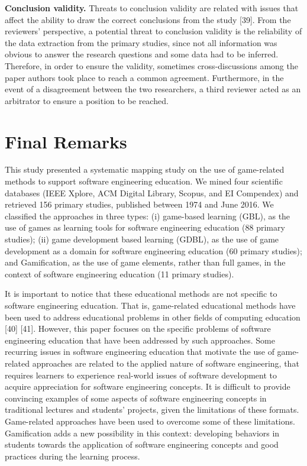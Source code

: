 \textbf{Conclusion validity.} Threats to conclusion validity are related with issues that affect the ability to draw the correct conclusions from the study \citep{Wohlin:2012}[39]. From the reviewers’ perspective, a potential threat to conclusion validity is the reliability of the data extraction from the primary studies, since not all information was obvious to answer the research questions and some data had to be inferred. Therefore, in order to ensure the validity, sometimes cross-discussions among the paper authors took place to reach a common agreement. Furthermore, in the event of a disagreement between the two researchers, a third reviewer acted as an arbitrator to ensure a position to be reached.

\section{Final Remarks}
\label{sec:final}

This study presented a systematic mapping study on the use of game-related methods to support software engineering education. We mined four scientific databases (IEEE Xplore, ACM Digital Library, Scopus, and EI Compendex) and retrieved 156 primary studies, published between 1974 and June 2016. We classified the approaches in three types: (i) game-based learning (GBL), as the use of games as learning tools for software engineering education (88 primary studies); (ii) game development based learning (GDBL), as the use of game development as a domain for software engineering education (60 primary studies); and Gamification, as the use of game elements, rather than full games, in the context of software engineering education (11 primary studies). 

It is important to notice that these educational methods are not specific to software engineering education. That is, game-related educational methods have been used to address educational problems in other fields of computing education \citep{Battistella:2016, Petri:2017}[40] [41]. However, this paper focuses on the specific problems of software engineering education that have been addressed by such approaches. Some recurring issues in software engineering education that motivate the use of game-related approaches are related to the applied nature of software engineering, that requires learners to experience real-world issues of software development to acquire appreciation for software engineering concepts. It is difficult to provide convincing examples of some aspects of software engineering concepts in traditional lectures and students’ projects, given the limitations of these formats. Game-related approaches have been used to overcome some of these limitations. Gamification adds a new possibility in this context: developing behaviors in students towards the application of software engineering concepts and good practices during the learning process. 

